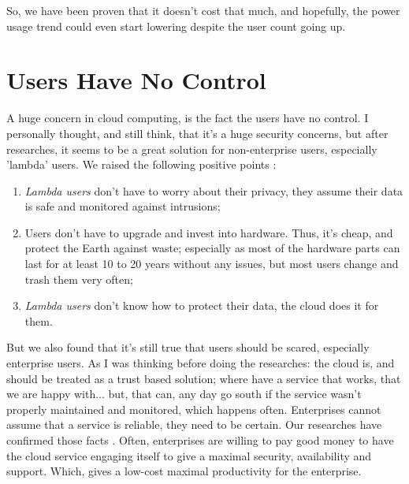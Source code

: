 \documentclass[final, a4paper, 9.5pt]{article}
\begin{document}
\begin{multicols}{2}
So, we have been proven that it doesn't cost that much, and hopefully, the power usage trend could even start lowering despite the user count going up.

\section*{Users Have No Control}
A huge concern in cloud computing, is the fact the users have no control. I personally thought, and still think, that it's a huge security concerns, but after researches, it seems to be a great solution for non-enterprise users, especially 'lambda' users. We raised the following positive points \cite{good_bad_ugly}:

\begin{enumerate}
    \item \emph{Lambda users} don't have to worry about their privacy, they assume their data is safe and monitored against intrusions;
    \item Users don't have to upgrade and invest into hardware. Thus, it's cheap, and protect the Earth against waste; especially as most of the hardware parts can last for at least 10 to 20 years without any issues, but most users change and trash them very often;
    \item \emph{Lambda users} don't know how to protect their data, the cloud does it for them.
\end{enumerate}

But we also found that it's still true that users should be scared, especially enterprise users. As I was thinking before doing the researches: the cloud is, and should be treated as a trust based solution; where have a service that works, that we are happy with... but, that can, any day go south if the service wasn't properly maintained and monitored, which happens often. Enterprises cannot assume that a service is reliable, they need to be certain. Our researches have confirmed those facts \cite{the_ugly}. Often, enterprises are willing to pay good money to have the cloud service engaging itself to give a maximal security, availability and support. Which, gives a low-cost maximal productivity for the enterprise.

\end{multicols}

\newpage
\end{document}
